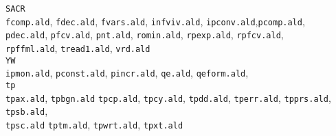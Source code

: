 {\begin{tabbing}
    {\tt SACR} \+ \\
              {\tt fcomp.ald}, {\tt fdec.ald},  {\tt fvars.ald}, 
              {\tt infviv.ald}, {\tt ipconv.ald},{\tt pcomp.ald}, \\
              {\tt pdec.ald},  {\tt pfcv.ald}, {\tt pnt.ald},
              {\tt romin.ald}, {\tt rpexp.ald},  {\tt rpfcv.ald}, \\
              {\tt rpffml.ald}, {\tt tread1.ald},  {\tt vrd.ald} \- \\
    {\tt YW} \+ \\
              {\tt ipmon.ald}, {\tt pconst.ald}, {\tt pincr.ald},
              {\tt qe.ald}, {\tt qeform.ald}, \- \- \\
    {\tt tp} \+ \\
    {\tt tpax.ald}, {\tt tpbgn.ald} {\tt tpcp.ald}, {\tt tpcy.ald},
    {\tt tpdd.ald}, {\tt tperr.ald}, {\tt tpprs.ald}, {\tt tpsb.ald}, \\
    {\tt tpsc.ald} {\tt tptm.ald}, {\tt tpwrt.ald}, {\tt tpxt.ald} \- 
\end{tabbing}
}
